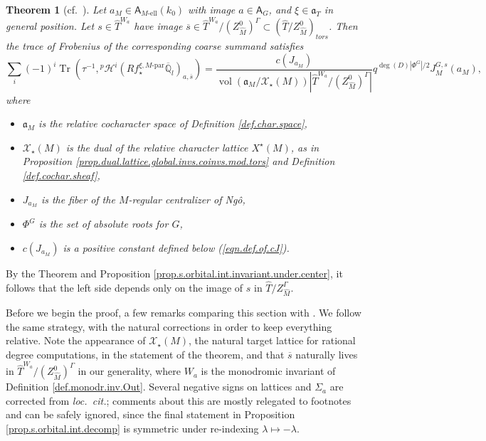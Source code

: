 \documentclass[openany]{amsbook}
\newtheorem{theorem}{Theorem}[chapter]
\theoremstyle{definition}
\theoremstyle{remark}
\numberwithin{equation}{section}
\newcommand{\Q}{\mathbb{Q}}
\newcommand{\cX}{\mathcal{X}}
\newcommand{\ol}[1]{\overline{#1}}
\newcommand{\Tr}{\operatorname{Tr }}
\newcommand{\vol}{\operatorname{vol}}
\renewcommand{\-}{\operatorname{-}}
\renewcommand{\a}{\mathfrak{a}}
\newcommand{\pHi}{{}^p \mathcal{H}^i}
\newcommand{\el}{\text{-ell}}
\newcommand{\bA}{\mathsf{A}}
\newcommand{\bAe}[1]{\bA_{#1\el}}
\newcommand{\Mpar}{M\text{-par}}
\newcommand{\tors}{\mathit{tors}}
\begin{document}
\begin{theorem}[{cf.\ \cite[Th\'eor\`eme 12.1.1]{CLII}}]\label{thm.s.summand.orbital.integral}
    Let $a_M \in \bAe{M}(k_0)$ with image $a \in \bA_G$, and $\xi \in \a_T$ in general position. Let $s \in \widehat{T}^{W_a}$ have image $\ol{s} \in \widehat{T}^{W_a}/(Z^0_{\widehat{M}})^\Gamma \subset (\widehat{T}/Z^0_{\widehat{M}})_{\tors}$. Then the trace of Frobenius of the corresponding coarse summand satisfies
    $$
        \sum_{i} (-1)^i \Tr(\tau^{-1}, \pHi(R f_\star^{\xi, \Mpar} \ol{\Q}_l)_{a, \ol{s}}) = \frac{c(J_{a_M})}{\vol(\a_M/\cX_\star(M)) |\widehat{T}^{W_a}/(Z^0_{\widehat{M}})^{\Gamma}|} q^{\deg(D) |\Phi^G|/2} J_M^{G,s}(a_M),
    $$
    where
    \begin{itemize}
        \item $\a_M$ is the relative cocharacter space of Definition \ref{def.char.space},
        \item $\cX_\star(M)$ is the dual of the relative character lattice $X^\star(M)$, as in Proposition \ref{prop.dual.lattice.global.invs.coinvs.mod.tors} and Definition \ref{def.cochar.sheaf},
        \item $J_{a_M}$ is the fiber of the $M$-regular centralizer of Ng\^{o},
        \item $\Phi^G$ is the set of absolute roots for $G$,
        \item $c(J_{a_M})$ is a positive constant defined below (\ref{eqn.def.of.cJ}).
    \end{itemize}
\end{theorem}

By the Theorem and Proposition \ref{prop.s.orbital.int.invariant.under.center}, it follows that the left side depends only on the image of $s$ in $\widehat{T}/Z_{\widehat{M}}^{\Gamma}$.

Before we begin the proof, a few remarks comparing this section with \cite[\S 12]{CLII}. We follow the same strategy, with the natural corrections in order to keep everything relative. Note the appearance of $\cX_\star(M)$, the natural target lattice for rational degree computations, in the statement of the theorem, and that $\ol{s}$ naturally lives in $\widehat{T}^{W_a}/(Z^0_{\widehat{M}})^\Gamma$ in our generality, where $W_a$ is the monodromic invariant of Definition \ref{def.monodr.inv.Out}. Several negative signs on lattices and $\Sigma_a$ are corrected from \textit{loc.\ cit.}; comments about this are mostly relegated to footnotes and can be safely ignored, since the final statement in Proposition \ref{prop.s.orbital.int.decomp} is symmetric under re-indexing $\lambda \mapsto -\lambda$.
\end{document}
